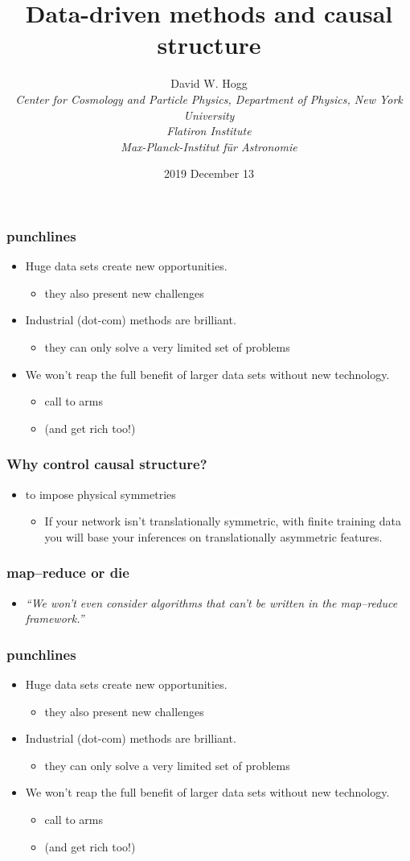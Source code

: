 \documentclass[pdftex,aspectratio=169]{beamer}
\title[Causal Structure]{Data-driven methods and causal structure}
\author[David W. Hogg \textsl{(NYU) (Flatiron) (MPIA)}]{David W. Hogg \\
  \textsl{\footnotesize Center for Cosmology and Particle Physics, Department of Physics, New York University}\\
  \textsl{\footnotesize Flatiron Institute }\\
  \textsl{\footnotesize Max-Planck-Institut f\"ur Astronomie}}
\date{2019 December 13}
\newcommand{\conclusion}{
\begin{frame}
  \frametitle{punchlines}
  \begin{itemize}
  \item Huge data sets create new opportunities.
    \begin{itemize}
    \item they also present new challenges
    \end{itemize}
  \item Industrial (dot-com) methods are brilliant.
    \begin{itemize}
    \item they can only solve a very limited set of problems
    \end{itemize}
  \item We won't reap the full benefit of larger data sets without new technology.
    \begin{itemize}
    \item call to arms
    \item (and get rich too!)
    \end{itemize}
  \end{itemize}
\end{frame}
}
\begin{document}
\begin{frame}[plain]
\maketitle
\end{frame}

\conclusion

\begin{frame}
  \frametitle{Why control causal structure?}
  \begin{itemize}
  \item to impose physical symmetries
    \begin{itemize}
    \item If your network isn't translationally symmetric, with finite training data you will base your inferences on translationally asymmetric features.
    \end{itemize}
  \end{itemize}
\end{frame}

\begin{frame}
  \frametitle{map--reduce or die}
  \begin{itemize}
  \item \textsl{``We won't even consider algorithms that can't be
    written in the map--reduce framework.''}
  \end{itemize}
\end{frame}

\conclusion
\end{document}
